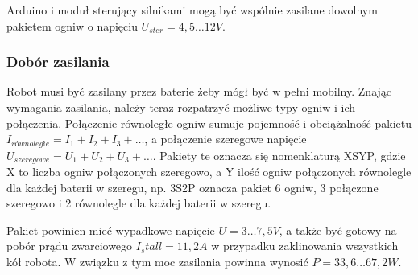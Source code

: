 \documentclass{report}
\begin{document}
Arduino i moduł sterujący silnikami mogą być wspólnie zasilane dowolnym pakietem ogniw o napięciu $U_{ster}=4,5\ldots12 V$.

\newpage
\subsubsection{Dobór zasilania}

Robot musi być zasilany przez baterie żeby mógł być w pełni mobilny. Znając wymagania zasilania, należy teraz rozpatrzyć możliwe typy ogniw i ich połączenia. Połączenie równoległe ogniw sumuje pojemność i obciążalność pakietu $I_{równoległe}=I_1+I_2+I_3+\ldots$, a połączenie szeregowe napięcie $U_{szeregowe}=U_1+U_2+U_3+\ldots$. Pakiety te oznacza się nomenklaturą XSYP, gdzie X to liczba ogniw połączonych szeregowo, a Y ilość ogniw połączonych równolegle dla każdej baterii w szeregu, np. 3S2P oznacza pakiet 6 ogniw, 3 połączone szeregowo i 2 równolegle dla każdej baterii w szeregu.

Pakiet powinien mieć wypadkowe napięcie $U=3\ldots7,5 V$, a także być gotowy na pobór prądu zwarciowego $I_stall=11,2 A$ w przypadku zaklinowania wszystkich kół robota. W związku z tym moc zasilania powinna wynosić $P=33,6\ldots67,2 W$.
\end{document}
